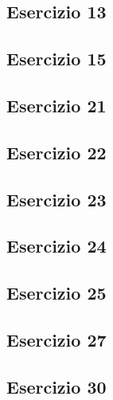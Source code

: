 \subsection{Esercizio 13}


\subsection{Esercizio 15}


\subsection{Esercizio 21}


\subsection{Esercizio 22}


\subsection{Esercizio 23}


\subsection{Esercizio 24}


\subsection{Esercizio 25}


\subsection{Esercizio 27}


\subsection{Esercizio 30}

